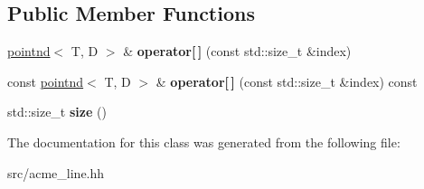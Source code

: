 \subsection*{Public Member Functions}
\begin{DoxyCompactItemize}
\item 
\mbox{\label{classacme_1_1linend_a65c3e459b2a2b4768edfd4e550efce70}} 
\hyperlink{classacme_1_1pointnd}{pointnd}$<$ T, D $>$ \& {\bfseries operator\mbox{[}$\,$\mbox{]}} (const std\+::size\+\_\+t \&index)
\item 
\mbox{\label{classacme_1_1linend_ac261d508a5222ae25402cab99e7befc5}} 
const \hyperlink{classacme_1_1pointnd}{pointnd}$<$ T, D $>$ \& {\bfseries operator\mbox{[}$\,$\mbox{]}} (const std\+::size\+\_\+t \&index) const
\item 
\mbox{\label{classacme_1_1linend_ae00237c0a82ba7022922ca99c386df60}} 
std\+::size\+\_\+t {\bfseries size} ()
\end{DoxyCompactItemize}


The documentation for this class was generated from the following file\+:\begin{DoxyCompactItemize}
\item 
src/acme\+\_\+line.\+hh\end{DoxyCompactItemize}
